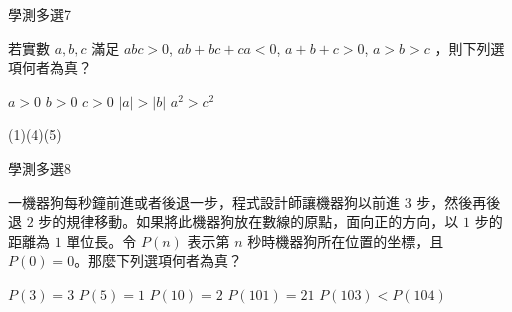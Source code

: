 \begin{QUESTIONS}
    \begin{QUESTION}
        \begin{ExamInfo}{91}{學測}{多選}{7}
        \end{ExamInfo}
        \begin{ExamAnsRateInfo}{75}{93}{82}{50}
        \end{ExamAnsRateInfo}
        \begin{QBODY}
            若實數 $a,b,c$ 滿足 $abc>0$, $ab+bc+ca<0$, $a+b+c>0$, $a>b>c$ ，則下列選項何者為真？ 
            \begin{QOPS} 
                \QOP $a>0$ 
                \QOP $b>0$ 
                \QOP $c>0$
                \QOP $|a|>|b|$ 
                \QOP $a^2>c^2$
            \end{QOPS}
        \end{QBODY}
        \begin{QFROMS}
        \end{QFROMS}
        \begin{QTAGS}\end{QTAGS}
        \begin{QANS}
            (1)(4)(5)
        \end{QANS}
        \begin{QSOLLIST}
        \end{QSOLLIST}
        \begin{QEMPTYSPACE}
        \end{QEMPTYSPACE}
    \end{QUESTION}
    \begin{QUESTION}
        \begin{ExamInfo}{91}{學測}{多選}{8}
        \end{ExamInfo}
        \begin{ExamAnsRateInfo}{60}{88}{64}{28}
        \end{ExamAnsRateInfo}
        \begin{QBODY}
            一機器狗每秒鐘前進或者後退一步，程式設計師讓機器狗以前進 $3$ 步，然後再後退 $2$ 步的規律移動。如果將此機器狗放在數線的原點，面向正的方向，以 $1$ 步的距離為 $1$ 單位長。令 $P(n)$ 表示第 $n$ 秒時機器狗所在位置的坐標，且 $P(0)=0$。那麼下列選項何者為真？ 
            \begin{QOPS}
                \QOP $P(3)=3$ 
                \QOP $P(5)=1$ 
                \QOP $P(10)=2$
                \QOP $P(101)=21$ 
                \QOP $P(103)<P(104)$
            \end{QOPS}

\end{QBODY}
\end{QUESTION}
\end{QUESTIONS}

